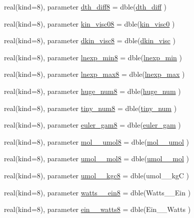 \begin{DoxyCompactItemize}
\item 
real(kind=8), parameter \hyperlink{namespaceconsts__coms_a6984abec74717e326619006a024c3fd8}{dth\+\_\+diff8} = dble(\hyperlink{namespaceconsts__coms_a3e11fe776d94f12ef432f8813a02e384}{dth\+\_\+diff} )
\item 
real(kind=8), parameter \hyperlink{namespaceconsts__coms_a412fde0c874abb8d51db37875fd0207d}{kin\+\_\+visc08} = dble(\hyperlink{namespaceconsts__coms_acff2483efb6558e2a08c463ffc2fe19d}{kin\+\_\+visc0} )
\item 
real(kind=8), parameter \hyperlink{namespaceconsts__coms_a1b2932c7fcf0fd58caa884160e4fb2e8}{dkin\+\_\+visc8} = dble(\hyperlink{namespaceconsts__coms_a2599993b07c6660c7d40283df30bf850}{dkin\+\_\+visc} )
\item 
real(kind=8), parameter \hyperlink{namespaceconsts__coms_a88b6625340c134995d6ce2ae8ad8f7b4}{lnexp\+\_\+min8} = dble(\hyperlink{namespaceconsts__coms_a7593d016f6b5a649ea21585de53834f0}{lnexp\+\_\+min} )
\item 
real(kind=8), parameter \hyperlink{namespaceconsts__coms_af97aceda250c3242870c60e2e5ad8f4c}{lnexp\+\_\+max8} = dble(\hyperlink{namespaceconsts__coms_aeb257212c54fabf595d8fb81170ef1d8}{lnexp\+\_\+max} )
\item 
real(kind=8), parameter \hyperlink{namespaceconsts__coms_ade7c97415ddfe86606e259317e709e8b}{huge\+\_\+num8} = dble(\hyperlink{namespaceconsts__coms_a6a5c10fb375429bb6cbc12bb37617f31}{huge\+\_\+num} )
\item 
real(kind=8), parameter \hyperlink{namespaceconsts__coms_a573c8ad925cab4a7c537ec6e2b20a7a3}{tiny\+\_\+num8} = dble(\hyperlink{namespaceconsts__coms_a9dc9f1b4f076c19c09ba1adb961cddc3}{tiny\+\_\+num} )
\item 
real(kind=8), parameter \hyperlink{namespaceconsts__coms_a61bc1f477f05d4493fec0947a2c52272}{euler\+\_\+gam8} = dble(\hyperlink{namespaceconsts__coms_aba6e0fb8ee2b35386bc108bca41f91d4}{euler\+\_\+gam} )
\item 
real(kind=8), parameter \hyperlink{namespaceconsts__coms_a667518325585dfb0f152a824bce1dcda}{mol\+\_\+\_\+umol8} = dble(\hyperlink{namespaceconsts__coms_a68d9924e4ce2e95d25b3c4862bf895d8}{mol\+\_\+\_\+umol} )
\item 
real(kind=8), parameter \hyperlink{namespaceconsts__coms_a1985bdf9dc2233ee0743d4c1f340d8ae}{umol\+\_\+\_\+mol8} = dble(\hyperlink{namespaceconsts__coms_aba28d1403d413d9d638ca1bf165cdd7a}{umol\+\_\+\_\+mol} )
\item 
real(kind=8), parameter \hyperlink{namespaceconsts__coms_a066d6cf149acd92238cbe2e623fcdf1c}{umol\+\_\+\_\+kgc8} = dble(umol\+\_\+\_\+kgC )
\item 
real(kind=8), parameter \hyperlink{namespaceconsts__coms_a58d5b3bd79a7637b140e4600eb27d5e9}{watts\+\_\+\_\+ein8} = dble(Watts\+\_\+\_\+\+Ein )
\item 
real(kind=8), parameter \hyperlink{namespaceconsts__coms_ad0b693d469a9252c873f9c2589d2dda9}{ein\+\_\+\_\+watts8} = dble(Ein\+\_\+\_\+\+Watts )
\end{DoxyCompactItemize}



